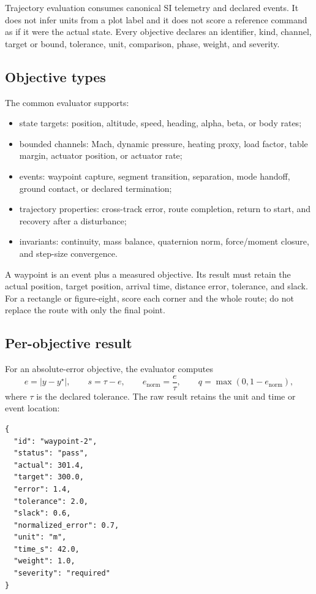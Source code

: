 \documentclass[11pt]{article}
\begin{document}
Trajectory evaluation consumes canonical SI telemetry and declared events. It
does not infer units from a plot label and it does not score a reference command
as if it were the actual state. Every objective declares an identifier, kind,
channel, target or bound, tolerance, unit, comparison, phase, weight, and
severity.

\subsection{Objective types}

The common evaluator supports:

\begin{itemize}
  \item state targets: position, altitude, speed, heading, alpha, beta, or
    body rates;
  \item bounded channels: Mach, dynamic pressure, heating proxy, load factor,
    table margin, actuator position, or actuator rate;
  \item events: waypoint capture, segment transition, separation, mode handoff,
    ground contact, or declared termination;
  \item trajectory properties: cross-track error, route completion, return to
    start, and recovery after a disturbance;
  \item invariants: continuity, mass balance, quaternion norm, force/moment
    closure, and step-size convergence.
\end{itemize}

A waypoint is an event plus a measured objective. Its result must retain the
actual position, target position, arrival time, distance error, tolerance, and
slack. For a rectangle or figure-eight, score each corner and the whole route;
do not replace the route with only the final point.

\subsection{Per-objective result}

For an absolute-error objective, the evaluator computes
\[
  e=|y-y^{\star}|, \qquad
  s=\tau-e, \qquad
  e_{\mathrm{norm}}=\frac{e}{\tau}, \qquad
  q=\max(0,1-e_{\mathrm{norm}}),
\]
where $\tau$ is the declared tolerance. The raw result retains the unit and
time or event location:

\begin{lstlisting}
{
  "id": "waypoint-2",
  "status": "pass",
  "actual": 301.4,
  "target": 300.0,
  "error": 1.4,
  "tolerance": 2.0,
  "slack": 0.6,
  "normalized_error": 0.7,
  "unit": "m",
  "time_s": 42.0,
  "weight": 1.0,
  "severity": "required"
}
\end{lstlisting}
\end{document}
